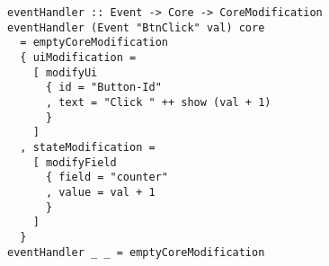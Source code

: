 \begin{verbatim}
eventHandler :: Event -> Core -> CoreModification
eventHandler (Event "BtnClick" val) core
  = emptyCoreModification
  { uiModification =
    [ modifyUi
      { id = "Button-Id"
      , text = "Click " ++ show (val + 1)
      }
    ]
  , stateModification =
    [ modifyField
      { field = "counter"
      , value = val + 1
      }
    ]
  }
eventHandler _ _ = emptyCoreModification
\end{verbatim}

